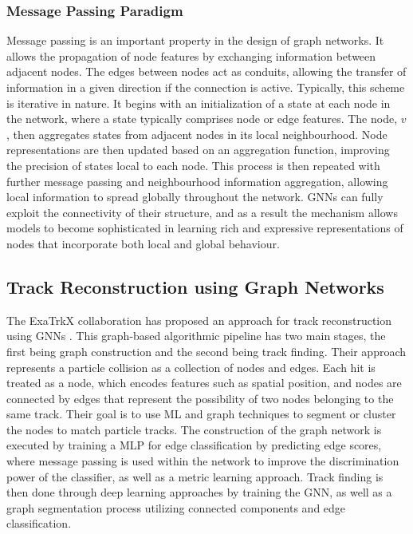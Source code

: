 \subsubsection{Message Passing Paradigm}

Message passing is an important property in the design of graph networks. It allows the propagation of node features by exchanging information between adjacent nodes. The edges between nodes act as conduits, allowing the transfer of information in a given direction if the connection is active. Typically, this scheme is iterative in nature. It begins with an initialization of a state at each node in the network, where a state typically comprises node or edge features. The node, $v$, then aggregates states from adjacent nodes in its local neighbourhood. Node representations are then updated based on an aggregation function, improving the precision of states local to each node. This process is then repeated with further message passing and neighbourhood information aggregation, allowing local information to spread globally throughout the network. GNNs can fully exploit the connectivity of their structure, and as a result the mechanism allows models to become sophisticated in learning rich and expressive representations of nodes that incorporate both local and global behaviour.


\subsection{Track Reconstruction using Graph Networks}
\label{track-recon-graph-networks}

The ExaTrkX collaboration \cite{ExaTrkX-website} has proposed an approach for track reconstruction using GNNs \cite{Caillou:2815578}. This graph-based algorithmic pipeline has two main stages, the first being graph construction and the second being track finding. Their approach represents a particle collision as a collection of nodes and edges. Each hit is treated as a node, which encodes features such as spatial position, and nodes are connected by edges that represent the possibility of two nodes belonging to the same track. Their goal is to use ML and graph techniques to segment or cluster the nodes to match particle tracks. The construction of the graph network is executed by training a MLP for edge classification by predicting edge scores, where message passing is used within the network to improve the discrimination power of the classifier, as well as a metric learning approach. Track finding is then done through deep learning approaches by training the GNN, as well as a graph segmentation process utilizing connected components and edge classification.

